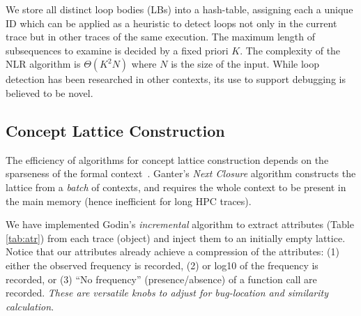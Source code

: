 %

We store all distinct loop bodies (LBs)
into a hash-table, assigning each a unique ID which can be applied as
a heuristic to detect loops not only in the current trace but in other
traces of the same execution.
%
The maximum length of subsequences to examine is decided by a fixed priori $K$.
%
The complexity of the NLR algorithm is $\Theta(K^2N)$ where $N$ is the size of the input. 
%
While loop detection has been researched in other contexts,
its use to support debugging is believed to be novel.

\subsection{Concept Lattice Construction}
\label{subsec:algo-cl}

%
The efficiency of algorithms for concept lattice construction
depends on the sparseness of the formal context~\cite{clgenperform}.
%
%
Ganter's \textit{Next Closure} algorithm \cite{clbook}
constructs the lattice from a
\textit{batch} of contexts, and requires the whole context to be present in the main memory
(hence inefficient for long HPC traces).
%
%

%
We have implemented Godin's \textit{incremental} algorithm \cite{clconst}
to extract attributes (Table \ref{tab:atr})
from each trace (object) and inject them to an initially empty lattice.
%
Notice that our attributes already achieve a compression of the attributes: (1) either the
observed frequency is recorded, (2) or log10 of the frequency is recorded, or (3) ``No frequency''
(presence/absence) of a function call are recorded.
%
{\em These are versatile knobs to adjust for bug-location and similarity calculation}.
  

